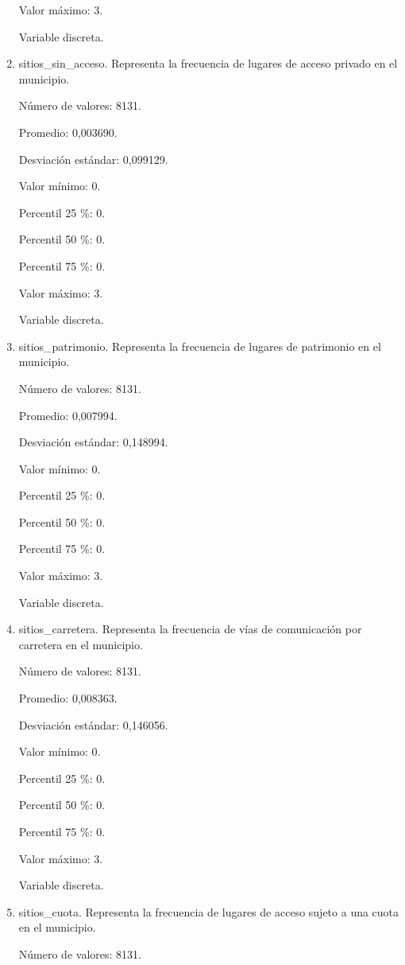 \begin{enumerate}
	Valor máximo: 3.
	
	Variable discreta.

	\item sitios\_sin\_acceso. Representa la frecuencia de lugares de acceso privado en el municipio.
	
	Número de valores: 8131.
	
	Promedio: 0,003690.
	
	Desviación estándar: 0,099129.
	
	Valor mínimo: 0.
	
	Percentil 25 \%: 0.
	
	Percentil 50 \%: 0.
	
	Percentil 75 \%: 0.
	
	Valor máximo: 3.
	
	Variable discreta.

	\item sitios\_patrimonio. Representa la frecuencia de lugares de patrimonio en el municipio.
	
	Número de valores: 8131.
	
	Promedio: 0,007994.
	
	Desviación estándar: 0,148994.
	
	Valor mínimo: 0.
	
	Percentil 25 \%: 0.
	
	Percentil 50 \%: 0.
	
	Percentil 75 \%: 0.
	
	Valor máximo: 3.
	
	Variable discreta.

	\item sitios\_carretera. Representa la frecuencia de vías de comunicación por carretera en el municipio.
	
	Número de valores: 8131.
	
	Promedio: 0,008363.
	
	Desviación estándar: 0,146056.
	
	Valor mínimo: 0.
	
	Percentil 25 \%: 0.
	
	Percentil 50 \%: 0.
	
	Percentil 75 \%: 0.
	
	Valor máximo: 3.
	
	Variable discreta.

	\item sitios\_cuota. Representa la frecuencia de lugares de acceso sujeto a una cuota en el municipio.
	
	Número de valores: 8131.
	

\end{enumerate}

